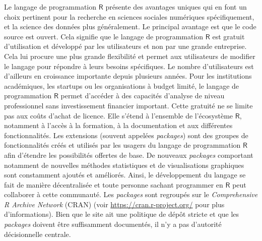 \documentclass[
  letterpaper,
  DIV=11,
  numbers=noendperiod,
  oneside]{scrreprt}
\begin{document}
Le langage de programmation \(\textsf{R}\) présente des avantages
uniques qui en font un choix pertinent pour la recherche en sciences
sociales numériques spécifiquement, et la science des données plus
généralement. Le principal avantage est que le code source est ouvert.
Cela signifie que le langage de programmation \(\textsf{R}\) est gratuit
d'utilisation et développé par les utilisateurs et non par une grande
entreprise. Cela lui procure une plus grande flexibilité et permet aux
utilisateurs de modifier le langage pour répondre à leurs besoins
spécifiques. Le nombre d'utilisateurs est d'ailleurs en croissance
importante depuis plusieurs années. Pour les institutions académiques,
les startups ou les organisations à budget limité, le langage de
programmation \(\textsf{R}\) permet d'accéder à des capacités d'analyse
de niveau professionnel sans investissement financier important. Cette
gratuité ne se limite pas aux coûts d'achat de licence. Elle s'étend à
l'ensemble de l'écosystème \(\textsf{R}\), notamment à l'accès à la
formation, à la documentation et aux différentes fonctionnalités. Les
extensions (souvent appelées \emph{packages}) sont des groupes de
fonctionnalités créés et utilisés par les usagers du langage de
programmation \(\textsf{R}\) afin d'étendre les possibilités offertes de
base. De nouveaux \emph{packages} comportant notamment de nouvelles
méthodes statistiques et de visualisations graphiques sont constamment
ajoutés et améliorés. Ainsi, le développement du langage se fait de
manière décentralisée et toute personne sachant programmer en
\(\textsf{R}\) peut collaborer à cette communauté. Les \emph{packages}
sont regroupés sur le \emph{Comprehensive R Archive Network} (CRAN)
(voir \url{https://cran.r-project.org/} pour plus d'informations). Bien
que le site ait une politique de dépôt stricte et que les
\emph{packages} doivent être suffisamment documentés, il n'y a pas
d'autorité décisionnelle centrale.
\end{document}
